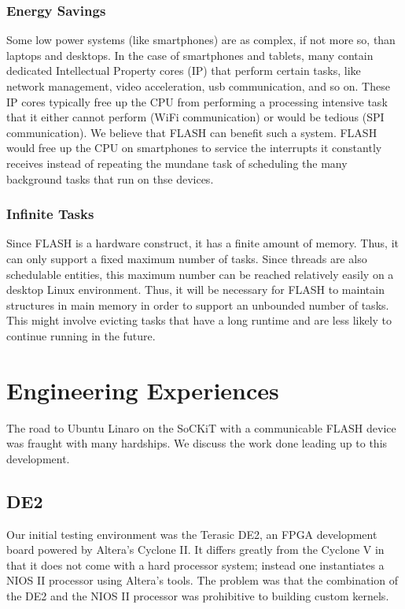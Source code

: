 \documentclass{sig-alternate-10pt}
\begin{document}
\subsubsection{Energy Savings}
Some low power systems (like smartphones) are as complex, if not more so,
than laptops and desktops. In the case of smartphones and tablets, many contain
dedicated Intellectual Property cores (IP) that perform certain tasks, like
network management, video acceleration, usb communication, and so on. These IP
cores typically free up the CPU from performing a processing intensive task
that it either cannot perform (WiFi communication) or would be tedious (SPI
communication). We believe that FLASH can benefit such a system. FLASH would
free up the CPU on smartphones to service the interrupts it constantly
receives instead of repeating the mundane task of scheduling the many
background tasks that run on thse devices.

\subsubsection{Infinite Tasks}
Since FLASH is a hardware construct, it has a finite amount of memory. Thus,
it can only support a fixed maximum number of tasks. Since threads are also
schedulable entities, this maximum number can be reached relatively easily
on a desktop Linux environment. Thus, it will be necessary for FLASH to
maintain structures in main memory in order to support an unbounded number
of tasks.  This might involve evicting tasks that have a long runtime and
are less likely to continue running in the future.


\section{Engineering Experiences}
\label{sec:eng_exp}
The road to Ubuntu Linaro on the SoCKiT with a communicable FLASH device was fraught with many hardships. We discuss the work done leading up to this development.
\subsection{DE2}
Our initial testing environment was the Terasic DE2, an FPGA development board powered by Altera's Cyclone II. It differs greatly from the Cyclone V in that it does not come with a hard processor system; instead one instantiates a NIOS II processor using Altera's tools. The problem was that the combination of the DE2 and the NIOS II processor was prohibitive to building custom kernels.
\end{document}
